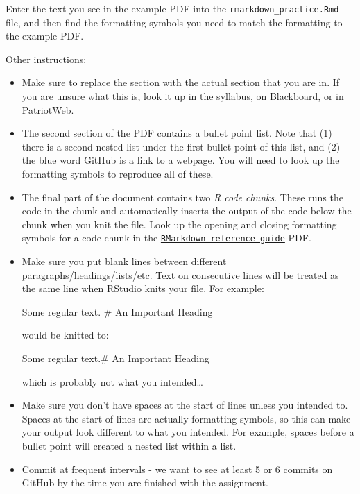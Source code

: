 \documentclass[
]{article}
\newenvironment{Shaded}{\begin{snugshade}}{\end{snugshade}}
\newcommand{\FunctionTok}[1]{\textcolor[rgb]{0.00,0.00,0.00}{#1}}
\newcommand{\NormalTok}[1]{#1}
\begin{document}
\begin{enumerate}
  Enter the text you see in the example PDF into the
  \texttt{rmarkdown\_practice.Rmd} file, and then find the formatting
  symbols you need to match the formatting to the example PDF.

  Other instructions:

  \begin{itemize}
  \item
    Make sure to replace the section with the actual section that you
    are in. If you are unsure what this is, look it up in the syllabus,
    on Blackboard, or in PatriotWeb.
  \item
    The second section of the PDF contains a bullet point list. Note
    that (1) there is a second nested list under the first bullet point
    of this list, and (2) the blue word GitHub is a link to a webpage.
    You will need to look up the formatting symbols to reproduce all of
    these.
  \item
    The final part of the document contains two \emph{R code chunks}.
    These runs the code in the chunk and automatically inserts the
    output of the code below the chunk when you knit the file. Look up
    the opening and closing formatting symbols for a code chunk in the
    \href{https://www.rstudio.com/wp-content/uploads/2015/03/rmarkdown-reference.pdf}{\texttt{RMarkdown\ reference\ guide}}
    PDF.
  \item
    Make sure you put blank lines between different
    paragraphs/headings/lists/etc. Text on consecutive lines will be
    treated as the same line when RStudio knits your file. For example:

\begin{Shaded}
\begin{Highlighting}[]
\NormalTok{Some regular text.}
\FunctionTok{\# An Important Heading}
\end{Highlighting}
\end{Shaded}

    would be knitted to:

    Some regular text.\# An Important Heading

    which is probably not what you intended\ldots{}
  \item
    Make sure you don't have spaces at the start of lines unless you
    intended to. Spaces at the start of lines are actually formatting
    symbols, so this can make your output look different to what you
    intended. For example, spaces before a bullet point will created a
    nested list within a list.
  \item
    Commit at frequent intervals - we want to see at least 5 or 6
    commits on GitHub by the time you are finished with the assignment.
  \end{itemize}
\end{enumerate}
\end{document}

